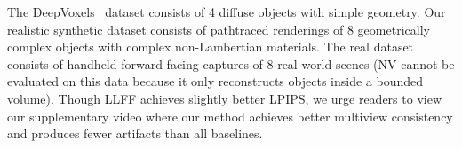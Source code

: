 \begin{table}[t]
{%
The DeepVoxels~\cite{deepvoxels} dataset consists of 4 diffuse objects with simple geometry. Our realistic synthetic dataset consists of pathtraced renderings of 8 geometrically complex objects with complex non-Lambertian materials. The real dataset consists of handheld forward-facing captures of 8 real-world scenes (NV cannot be evaluated on this data because it only reconstructs objects inside a bounded volume). 
Though LLFF achieves slightly better LPIPS, 
we urge readers to view our supplementary video where our method achieves better multiview consistency and produces fewer artifacts than all baselines.
} \vspace{-2mm}

\label{table:results}  
\end{table}
\setlength{\tabcolsep}{1.4pt}